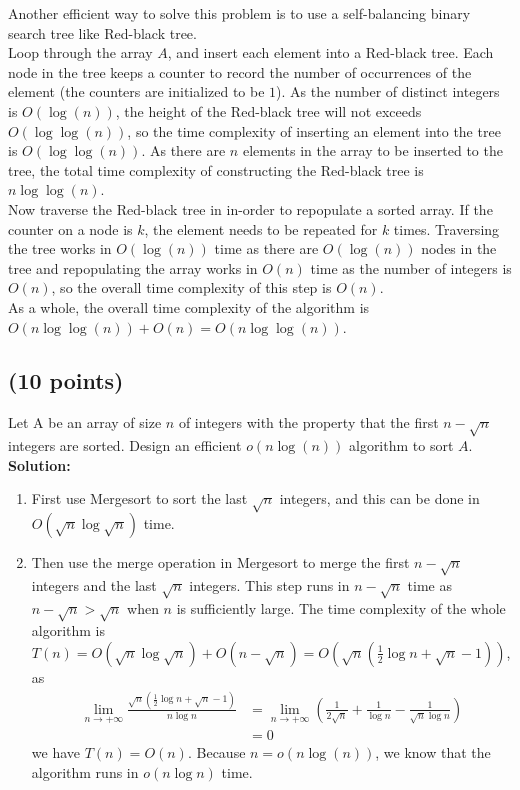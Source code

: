 \documentclass[letterpaper, 11pt]{article}
\begin{document}
Another efficient way to solve this problem is to use a self-balancing binary search tree like Red-black tree. 
\\Loop through the array $A$, and insert each element into a Red-black tree. Each node in the tree keeps a counter to record the number of occurrences of the element (the counters are initialized to be $1$). As the number of distinct integers is $O(\log(n))$, the height of the Red-black tree will not exceeds $O(\log\log(n))$, so the time complexity of inserting an element into the tree is $O(\log\log(n))$. As there are $n$
elements in the array to be inserted to the tree, the total time complexity of constructing the Red-black tree is $n\log\log(n)$.\\
Now traverse the Red-black tree in in-order to repopulate a sorted array. If the counter on a node is $k$, the element needs to be repeated for $k$ times. Traversing the tree works in $O(\log(n))$ time as there are $O(\log(n))$ nodes in the tree and repopulating the array works in $O(n)$ time as the number of integers is $O(n)$, so the overall time complexity of this step is $O(n)$.\\
As a whole, the overall time complexity of the algorithm is $O(n\log\log(n)) + O(n)=O(n\log\log(n))$.

\subsection{(10 points)}
Let A be an array of size $n$ of integers with the property that the first $n-\sqrt{n}$ integers are sorted. Design an efficient $o(n\log(n))$ algorithm to sort $A$.\\

\textbf{Solution:} 
\begin{enumerate}
    \item First use Mergesort to sort the last $\sqrt{n}$ integers, and this can be done in $O(\sqrt{n}\log{\sqrt{n}})$ time. 
    \item Then use the merge operation in Mergesort to merge the first $n-\sqrt{n}$ integers and the last $\sqrt{n}$ integers. This step runs in $n-\sqrt{n}$ time as $n-\sqrt{n}>\sqrt{n}$ when $n$ is sufficiently large. The time complexity of the whole algorithm is $T(n)=O(\sqrt{n}\log{\sqrt{n}}) +
O(n-\sqrt{n})=O(\sqrt{n}(\frac{1}{2}\log{n}+\sqrt{n}-1))$, as
\begin{align}
    \lim_{n \rightarrow +\infty}{\frac{\sqrt{n}(\frac{1}{2}\log{n}+\sqrt{n}-1)}{n\log{n}}} 
    &= \lim_{n \rightarrow +\infty}({\frac{1}{2\sqrt{n}}+\frac{1}{\log{n}}-\frac{1}{\sqrt{n}\log{n}}})\\
    &= 0
\end{align}
we have $T(n)=O(n)$. Because $n=o(n\log(n))$, we know that the algorithm runs in $o(n\log{n})$ time.
\end{enumerate}
\end{document}
